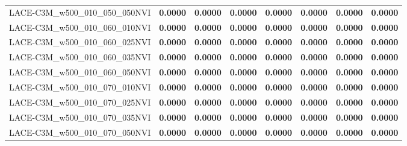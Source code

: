 \begin{table}
\begin{tabular}{lrrrrrrr}
LACE-C3M\_w500\_010\_050\_050NVI & \textbf{0.0000} & \textbf{0.0000} & \textbf{0.0000} & \textbf{0.0000} & \textbf{0.0000} & \textbf{0.0000} & \textbf{0.0000} \\
LACE-C3M\_w500\_010\_060\_010NVI & \textbf{0.0000} & \textbf{0.0000} & \textbf{0.0000} & \textbf{0.0000} & \textbf{0.0000} & \textbf{0.0000} & \textbf{0.0000} \\
LACE-C3M\_w500\_010\_060\_025NVI & \textbf{0.0000} & \textbf{0.0000} & \textbf{0.0000} & \textbf{0.0000} & \textbf{0.0000} & \textbf{0.0000} & \textbf{0.0000} \\
LACE-C3M\_w500\_010\_060\_035NVI & \textbf{0.0000} & \textbf{0.0000} & \textbf{0.0000} & \textbf{0.0000} & \textbf{0.0000} & \textbf{0.0000} & \textbf{0.0000} \\
LACE-C3M\_w500\_010\_060\_050NVI & \textbf{0.0000} & \textbf{0.0000} & \textbf{0.0000} & \textbf{0.0000} & \textbf{0.0000} & \textbf{0.0000} & \textbf{0.0000} \\
LACE-C3M\_w500\_010\_070\_010NVI & \textbf{0.0000} & \textbf{0.0000} & \textbf{0.0000} & \textbf{0.0000} & \textbf{0.0000} & \textbf{0.0000} & \textbf{0.0000} \\
LACE-C3M\_w500\_010\_070\_025NVI & \textbf{0.0000} & \textbf{0.0000} & \textbf{0.0000} & \textbf{0.0000} & \textbf{0.0000} & \textbf{0.0000} & \textbf{0.0000} \\
LACE-C3M\_w500\_010\_070\_035NVI & \textbf{0.0000} & \textbf{0.0000} & \textbf{0.0000} & \textbf{0.0000} & \textbf{0.0000} & \textbf{0.0000} & \textbf{0.0000} \\
LACE-C3M\_w500\_010\_070\_050NVI & \textbf{0.0000} & \textbf{0.0000} & \textbf{0.0000} & \textbf{0.0000} & \textbf{0.0000} & \textbf{0.0000} & \textbf{0.0000} \\
\bottomrule
\end{tabular}
\end{table}
